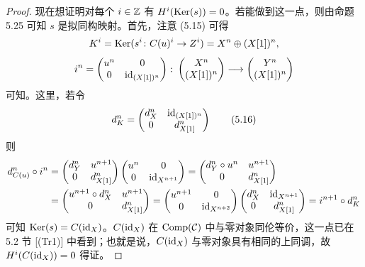 \begin{proof}
现在想证明对每个 $i\in\mathbb{Z}$ 有 $H^i(\operatorname{Ker}(s))=0$。若能做到这一点，则由命题 5.25 可知 $s$ 是拟同构映射。首先，注意 (5.15) 可得
\[
  K^i=\operatorname{Ker}(s^i\colon C(u)^i\to Z^i)=X^n\oplus (X[1])^n,
\]
\[
  i^n=\begin{pmatrix} u^n & 0 \\ 0 & \mathrm{id}_{(X[1])^n}\end{pmatrix}\colon
  \begin{pmatrix} X^n \\ (X[1])^n\end{pmatrix}\longrightarrow
  \begin{pmatrix} Y^n \\ (X[1])^n\end{pmatrix}
\]
可知。这里，若令
\begin{equation}
  d_K^n=\begin{pmatrix} d_X^n & \mathrm{id}_{(X[1])^n} \\ 0 & d_{X[1]}^n\end{pmatrix} \tag{5.16}
\end{equation}
则
\begin{align*}
  d_{C(u)}^n\circ i^n
  &= \begin{pmatrix} d_Y^n & u^{n+1} \\ 0 & d_{X[1]}^n\end{pmatrix}
     \begin{pmatrix} u^n & 0 \\ 0 & \mathrm{id}_{X^{n+1}}\end{pmatrix}
   = \begin{pmatrix} d_Y^n\circ u^n & u^{n+1} \\ 0 & d_{X[1]}^n\end{pmatrix}\\
  &= \begin{pmatrix} u^{n+1}\circ d_X^n & u^{n+1} \\ 0 & d_{X[1]}^n\end{pmatrix}
   = \begin{pmatrix} u^{n+1} & 0 \\ 0 & \mathrm{id}_{X^{n+2}}\end{pmatrix}
     \begin{pmatrix} d_X^n & \mathrm{id}_{X^{n+1}} \\ 0 & d_{X[1]}^n\end{pmatrix}
   = i^{n+1}\circ d_K^n
\end{align*}
可知 $\operatorname{Ker}(s)=C(\mathrm{id}_X)$。$C(\mathrm{id}_X)$ 在 $\operatorname{Comp}(\mathcal{C})$ 中与零对象同伦等价，这一点已在 5.2 节 [(Tr1)] 中看到；也就是说，$C(\mathrm{id}_X)$ 与零对象具有相同的上同调，故 $H^i(C(\mathrm{id}_X))=0$ 得证。
\end{proof}

